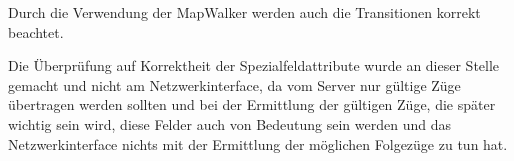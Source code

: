 Durch die Verwendung der MapWalker werden auch die Transitionen korrekt beachtet.

Die Überprüfung auf Korrektheit der Spezialfeldattribute wurde an dieser Stelle gemacht und nicht am Netzwerkinterface, da vom Server nur gültige Züge übertragen werden sollten und bei der Ermittlung der gültigen Züge, die später wichtig sein wird, diese Felder auch von Bedeutung sein werden und das Netzwerkinterface nichts mit der Ermittlung der möglichen Folgezüge zu tun hat.